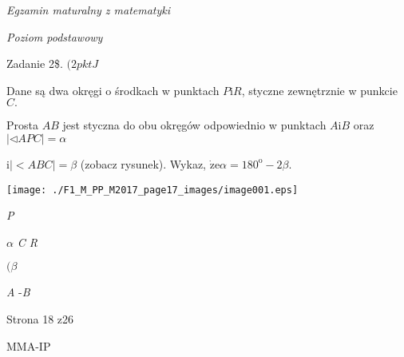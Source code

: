 \documentclass[a4paper,12pt]{article}
\begin{document}
{\it Egzamin maturalny z matematyki}

{\it Poziom podstawowy}

Zadanie 2{\$}. $(2pktJ$

Dane są dwa okręgi o środkach w punktach $P \mathrm{i} R$, styczne zewnętrznie w punkcie $C.$

Prosta $AB$ jest styczna do obu okręgów odpowiednio w punktach $A \mathrm{i}B$ oraz $|\triangleleft APC|=\alpha$

$\mathrm{i}|<ABC|=\beta$ (zobacz rysunek). Wykaz, $\dot{\mathrm{z}}\mathrm{e}\alpha=180^{\mathrm{o}}-2\beta.$
\begin{center}
\texttt{[image: ./F1\_M\_PP\_M2017\_page17\_images/image001.eps]}
\end{center}
{\it P}

$\alpha$  {\it C  R}

$(\beta$

{\it A}  -{\it B}

Strona 18 z26

MMA-IP
\end{document}
